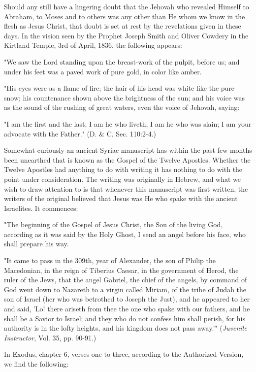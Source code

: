 Should any still have a lingering doubt that the Jehovah who revealed Himself to Abraham,
to Moses and to others was any other than He whom we know in the flesh as Jesus Christ,
that doubt is set at rest by the revelations given in these days. In the vision seen by the
Prophet Joseph Smith and Oliver Cowdery in the Kirtland Temple, 3rd of April, 1836, the
following appears:

"We saw the Lord standing upon the breast-work of the pulpit, before us; and under his feet
was a paved work of pure gold, in color like amber.

"His eyes were as a flame of fire; the hair of his head was white like the pure snow; his
countenance shown above the brightness of the sun; and his voice was as the sound of the
rushing of great waters, even the voice of Jehovah, saying:

"I am the first and the last; I am he who liveth, I am he who was slain; I am your advocate
with the Father." (D. \& C. Sec. 110:2-4.)

Somewhat curiously an ancient Syriac manuscript has within the past few months been
unearthed that is known as the Gospel of the Twelve Apostles. Whether the Twelve Apostles
had anything to do with writing it has nothing to do with the point under consideration. The
writing was originally in Hebrew, and what we wish to draw attention to is that whenever
this manuscript was first written, the writers of the original believed that Jesus was He who
spake with the ancient Israelites. It commences:

"The beginning of the Gospel of Jesus Christ, the Son of the living God, according as it was
said by the Holy Ghost, I send an angel before his face, who shall prepare his way.

"It came to pass in the 309th, year of Alexander, the son of Philip the Macedonian, in the
reign of Tiberius Caesar, in the government of Herod, the ruler of the Jews, that the angel
Gabriel, the chief of the angels, by command of God went down to Nazareth to a virgin
called Miriam, of the tribe of Judah the son of Israel (her who was betrothed to Joseph the
Just), and he appeared to her and said, 'Lo! there ariseth from thee the one who spake with
our fathers, and he shall be a Savior to Israel; and they who do not confess him shall perish,
for his authority is in the lofty heights, and his kingdom does not pass away.'" (\textit{Juvenile
Instructor}, Vol. 35, pp. 90-91.)

In Exodus, chapter 6, verses one to three, according to the Authorized Version, we find the
following:

